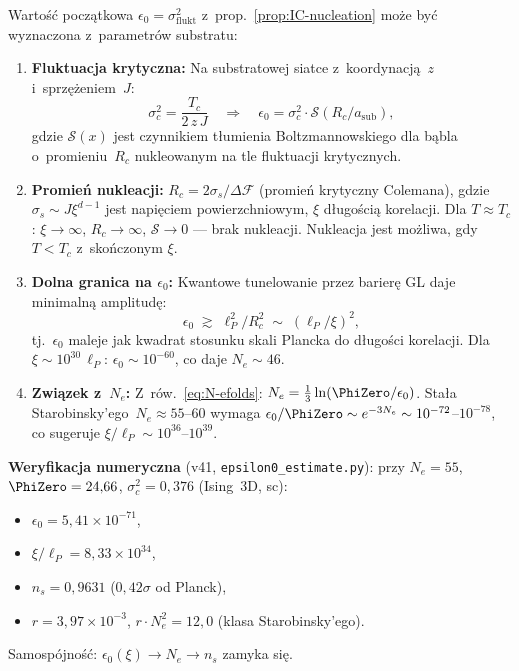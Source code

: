 \begin{remark}%
\label{rem:epsilon0-derivation}
Warto\'s\'c pocz\k{a}tkowa $\epsilon_0 = \sigma^2_{\mathrm{flukt}}$
z~prop.~\ref{prop:IC-nucleation} mo\.ze by\'c wyznaczona
z~parametr\'ow substratu:
\begin{enumerate}[nosep]
  \item \textbf{Fluktuacja krytyczna:}
    Na substratowej siatce z~koordynacj\k{a}~$z$ i~sprz\k{e}\.zeniem~$J$:
    \begin{equation}\label{eq:sigma-crit}
      \sigma^2_c = \frac{T_c}{2\,z\,J}
      \quad\Longrightarrow\quad
      \epsilon_0 = \sigma^2_c \cdot \mathcal{S}(R_c/a_\mathrm{sub}),
    \end{equation}
    gdzie $\mathcal{S}(x)$ jest czynnikiem t\l{}umienia Boltzmannowskiego
    dla b\k{a}bla o~promieniu~$R_c$ nukleowanym na tle
    fluktuacji krytycznych.
  \item \textbf{Promie\'n nukleacji:}
    $R_c = 2\sigma_s / \Delta\mathcal{F}$ (promie\'n krytyczny Colemana),
    gdzie $\sigma_s \sim J\xi^{d-1}$ jest napi\k{e}ciem
    powierzchniowym, $\xi$ d\l{}ugo\'sci\k{a} korelacji.
    Dla $T \approx T_c$: $\xi \to \infty$,
    $R_c \to \infty$, $\mathcal{S} \to 0$ --- brak
    nukleacji. Nukleacja jest mo\.zliwa, gdy $T < T_c$
    z~sko\'nczonym $\xi$.
  \item \textbf{Dolna granica na $\epsilon_0$:}
    Kwantowe tunelowanie przez barier\k{e} GL daje minimaln\k{a}
    amplitud\k{e}:
    \begin{equation}\label{eq:eps0-bound}
      \epsilon_0 \;\gtrsim\; \ell_P^2 / R_c^2
      \;\sim\; (\ell_P / \xi)^2,
    \end{equation}
    tj.\ $\epsilon_0$ maleje jak kwadrat stosunku
    skali Plancka do d\l{}ugo\'sci korelacji.
    Dla $\xi \sim 10^{30}\,\ell_P$:
    $\epsilon_0 \sim 10^{-60}$, co daje $N_e \sim 46$.
  \item \textbf{Zwi\k{a}zek z~$N_e$:}
    Z~r\'ow.~\eqref{eq:N-efolds}:
    $N_e = \frac{1}{3}\ln(\PhiZero/\epsilon_0)$.
    Sta\l{}a Starobinsky'ego~$N_e \approx 55$--$60$
    wymaga $\epsilon_0 / \PhiZero \sim e^{-3N_e}
    \sim 10^{-72}$--$10^{-78}$,
    co sugeruje $\xi / \ell_P \sim 10^{36}$--$10^{39}$.
\end{enumerate}

\smallskip\noindent
\textbf{Weryfikacja numeryczna} (v41, \texttt{epsilon0\_estimate.py}):
przy $N_e = 55$, $\PhiZero = 24{,}66$, $\sigma^2_c = 0{,}376$ (Ising~3D, sc):
\begin{itemize}[nosep]
  \item $\epsilon_0 = 5{,}41 \times 10^{-71}$,
  \item $\xi/\ell_P = 8{,}33 \times 10^{34}$,
  \item $n_s = 0{,}9631$ ($0{,}42\sigma$ od Planck),
  \item $r = 3{,}97 \times 10^{-3}$, $r \cdot N_e^2 = 12{,}0$
    (klasa Starobinsky'ego).
\end{itemize}
Samospójność: $\epsilon_0(\xi) \to N_e \to n_s$ zamyka się.


\end{remark}
